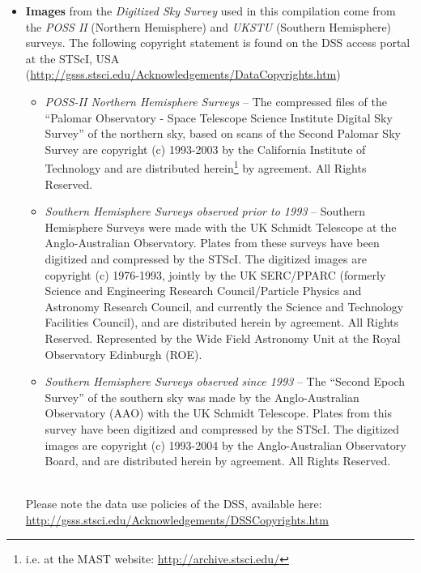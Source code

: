 \begin{itemize}
\item \textbf{Images} from the \emph{Digitized Sky Survey} used in
  this compilation come from the \emph{POSS II} (Northern Hemisphere)
  and \emph{UKSTU} (Southern Hemisphere) surveys. The following
  copyright statement is found on the DSS access portal at the STScI,
  USA
  (\url{http://gsss.stsci.edu/Acknowledgements/DataCopyrights.htm})

  \begin{itemize}
    \item \emph{POSS-II Northern Hemisphere Surveys} -- The compressed
      files of the ``Palomar Observatory - Space Telescope Science
      Institute Digital Sky Survey'' of the northern sky, based on
      scans of the Second Palomar Sky Survey are copyright (c)
      1993-2003 by the California Institute of Technology and are
      distributed herein\footnote{i.e. at the MAST website:
        \url{http://archive.stsci.edu/}} by agreement. All Rights
      Reserved.
    \item \emph{Southern Hemisphere Surveys observed prior to 1993} --
      Southern Hemisphere Surveys were made with the UK Schmidt
      Telescope at the Anglo-Australian Observatory. Plates from these
      surveys have been digitized and compressed by the STScI. The
      digitized images are copyright (c) 1976-1993, jointly by the UK
      SERC/PPARC (formerly Science and Engineering Research
      Council/Particle Physics and Astronomy Research Council, and
      currently the Science and Technology Facilities Council), and
      are distributed herein by agreement. All Rights
      Reserved. Represented by the Wide Field Astronomy Unit at the
      Royal Observatory Edinburgh (ROE).
    \item \emph{Southern Hemisphere Surveys observed since 1993} --
      The ``Second Epoch Survey'' of the southern sky was made by the
      Anglo-Australian Observatory (AAO) with the UK Schmidt
      Telescope. Plates from this survey have been digitized and
      compressed by the STScI. The digitized images are copyright (c)
      1993-2004 by the Anglo-Australian Observatory Board, and are
      distributed herein by agreement. All Rights Reserved.
  \end{itemize}

  \\

  Please note the data use policies of the DSS, available here:
  \url{http://gsss.stsci.edu/Acknowledgements/DSSCopyrights.htm}
  

\end{itemize}
